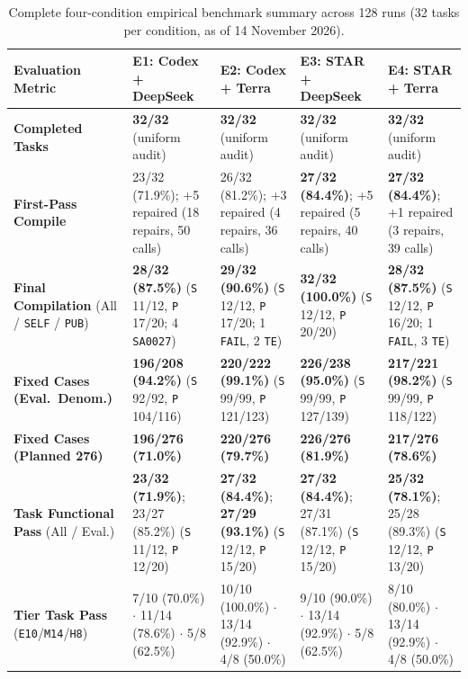 \begin{table}[htbp]
\centering
\caption{Complete four-condition empirical benchmark summary across 128 runs (32 tasks per condition, as of 14 November 2026).}
\label{tab:benchmark}
\scriptsize
\setlength{\tabcolsep}{4pt}
\begin{tabularx}{\textwidth}{@{}>{\raggedright\arraybackslash}p{}YYYY@{}}
\toprule
\textbf{Evaluation Metric} & \textbf{E1: Codex + DeepSeek} & \textbf{E2: Codex + Terra} & \textbf{E3: STAR + DeepSeek} & \textbf{E4: STAR + Terra} \\
\midrule
\textbf{Completed Tasks} & \textbf{32/32} (uniform audit) & \textbf{32/32} (uniform audit) & \textbf{32/32} (uniform audit) & \textbf{32/32} (uniform audit) \\
\textbf{First-Pass Compile} & 23/32 (71.9\%); +5 repaired (18 repairs, 50 calls) & 26/32 (81.2\%); +3 repaired (4 repairs, 36 calls) & \textbf{27/32 (84.4\%)}; +5 repaired (5 repairs, 40 calls) & \textbf{27/32 (84.4\%)}; +1 repaired (3 repairs, 39 calls) \\
\textbf{Final Compilation} (All / \texttt{SELF} / \texttt{PUB}) & \textbf{28/32 (87.5\%)} (\texttt{S} 11/12, \texttt{P} 17/20; 4 \texttt{SA0027}) & \textbf{29/32 (90.6\%)} (\texttt{S} 12/12, \texttt{P} 17/20; 1 \texttt{FAIL}, 2 \texttt{TE}) & \textbf{32/32 (100.0\%)} (\texttt{S} 12/12, \texttt{P} 20/20) & \textbf{28/32 (87.5\%)} (\texttt{S} 12/12, \texttt{P} 16/20; 1 \texttt{FAIL}, 3 \texttt{TE}) \\
\textbf{Fixed Cases (Eval.\ Denom.)} & \textbf{196/208 (94.2\%)} (\texttt{S} 92/92, \texttt{P} 104/116) & \textbf{220/222 (99.1\%)} (\texttt{S} 99/99, \texttt{P} 121/123) & \textbf{226/238 (95.0\%)} (\texttt{S} 99/99, \texttt{P} 127/139) & \textbf{217/221 (98.2\%)} (\texttt{S} 99/99, \texttt{P} 118/122) \\
\textbf{Fixed Cases (Planned 276)} & \textbf{196/276 (71.0\%)} & \textbf{220/276 (79.7\%)} & \textbf{226/276 (81.9\%)} & \textbf{217/276 (78.6\%)} \\
\textbf{Task Functional Pass} (All / Eval.) & \textbf{23/32 (71.9\%)}; 23/27 (85.2\%) (\texttt{S} 11/12, \texttt{P} 12/20) & \textbf{27/32 (84.4\%)}; \textbf{27/29 (93.1\%)} (\texttt{S} 12/12, \texttt{P} 15/20) & \textbf{27/32 (84.4\%)}; 27/31 (87.1\%) (\texttt{S} 12/12, \texttt{P} 15/20) & \textbf{25/32 (78.1\%)}; 25/28 (89.3\%) (\texttt{S} 12/12, \texttt{P} 13/20) \\
\textbf{Tier Task Pass} (\texttt{E10}/\texttt{M14}/\texttt{H8}) & 7/10 (70.0\%) $\cdot$ 11/14 (78.6\%) $\cdot$ 5/8 (62.5\%) & 10/10 (100.0\%) $\cdot$ 13/14 (92.9\%) $\cdot$ 4/8 (50.0\%) & 9/10 (90.0\%) $\cdot$ 13/14 (92.9\%) $\cdot$ 5/8 (62.5\%) & 8/10 (80.0\%) $\cdot$ 13/14 (92.9\%) $\cdot$ 4/8 (50.0\%) \\

\end{tabularx}
\end{table}
